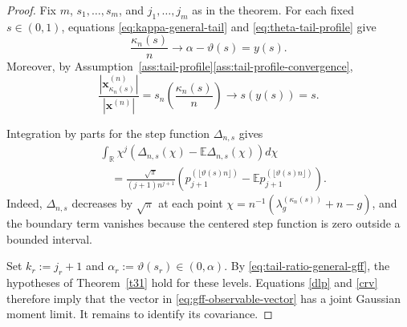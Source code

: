 \documentclass[11pt]{amsart}
\theoremstyle{plain}
\numberwithin{equation}{section}
\numberwithin{theorem}{section}
\numberwithin{figure}{section}
\begin{document}
\begin{proof}
Fix $m$, $s_1,\ldots,s_m$, and $j_1,\ldots,j_m$ as in the theorem. For
each fixed $s\in(0,1)$, equations
\eqref{eq:kappa-general-tail} and
\eqref{eq:theta-tail-profile} give
\[
    \frac{\kappa_n(s)}{n}
    \longrightarrow
    \alpha-\vartheta(s)
    =y(s).
\]
Moreover, by
Assumption~\ref{ass:tail-profile}\ref{ass:tail-profile-convergence},
\begin{equation}
    \frac{|\mathbf x^{(n)}_{\kappa_n(s)}|}
         {|\mathbf x^{(n)}|}
    =
    s_n\left(\frac{\kappa_n(s)}{n}\right)
    \longrightarrow
    s(y(s))
    =s.
    \label{eq:tail-ratio-general-gff}
\end{equation}

Integration by parts for the step function $\Delta_{n,s}$ gives
\begin{align}
&\int_{\mathbb R}\chi^j
\left(
    \Delta_{n,s}(\chi)-\mathbb E\Delta_{n,s}(\chi)
\right)d\chi
\label{cx}\\
&\quad=
\frac{\sqrt\pi}{(j+1)n^{j+1}}
\left(
    p_{j+1}^{(\lfloor\vartheta(s)n\rfloor)}
    -\mathbb E p_{j+1}^{(\lfloor\vartheta(s)n\rfloor)}
\right).
\label{dlp}
\end{align}
Indeed, $\Delta_{n,s}$ decreases by $\sqrt\pi$ at each point
$\chi=n^{-1}(\lambda_g^{(\kappa_n(s))}+n-g)$, and the boundary term
vanishes because the centered step function is zero outside a bounded
interval.

Set $k_r:=j_r+1$ and
$\alpha_r:=\vartheta(s_r)\in(0,\alpha)$. By
\eqref{eq:tail-ratio-general-gff}, the hypotheses of
Theorem~\ref{t31} hold for these levels. Equations
\eqref{dlp} and \eqref{crv} therefore imply that the vector in
\eqref{eq:gff-observable-vector} has a joint Gaussian moment limit. It
remains to identify its covariance.

\begingroup


\end{proof}
\end{document}
